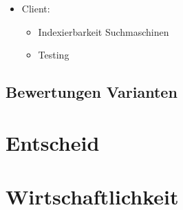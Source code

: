 \begin{itemize}
\tightlist
\item
  Client:
  \begin{itemize}
  \tightlist
  \item
    Indexierbarkeit Suchmaschinen
  \item
    Testing
  \end{itemize}
\end{itemize}

\subsection{Bewertungen Varianten}\label{bewertungen-varianten}

\section{Entscheid}\label{entscheid}

\section{Wirtschaftlichkeit}\label{wirtschaftlichkeit}
